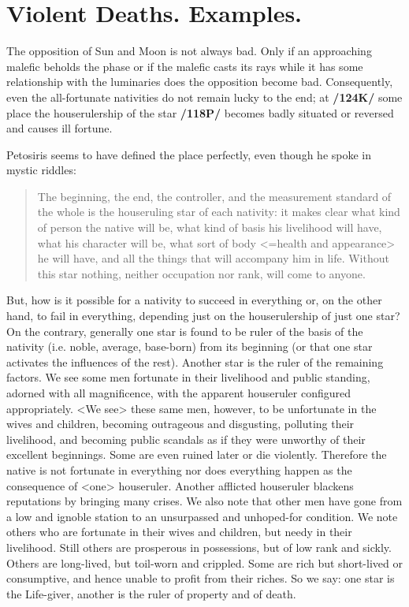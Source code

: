 \section{Violent Deaths. Examples.}

The opposition of Sun and Moon is not always bad. Only if an approaching malefic beholds the phase or if the malefic casts its rays while it has some relationship with the luminaries does the opposition become bad. Consequently, even the all-fortunate nativities do not remain lucky to the end; at \textbf{/124K/} some place the houserulership of the star \textbf{/118P/} becomes badly situated or reversed and causes ill fortune.

Petosiris seems to have defined the place perfectly, even though he spoke in mystic riddles: \begin{quote}The
beginning, the end, the controller, and the measurement standard of the whole is the houseruling star of
each nativity: it makes clear what kind of person the native will be, what kind of basis his livelihood will have, what his character will be, what sort of body <=health and appearance> he will have, and all the things that will accompany him in life. Without this star nothing, neither occupation nor rank, will come to anyone.\end{quote}

But, how is it possible for a nativity to succeed in everything or, on the other hand, to fail in everything, depending just on the houserulership of just one star? On the contrary, generally one star is found to be ruler of the basis of the nativity (i.e. noble, average, base-born) from its beginning (or that one star activates the influences of the rest). Another star is the ruler of the remaining factors. We see some men fortunate in their livelihood and public standing, adorned with all magnificence, with the apparent houseruler configured appropriately. <We see> these same men, however, to be unfortunate in the wives
and children, becoming outrageous and disgusting, polluting their livelihood, and becoming public scandals as if they were unworthy of their excellent beginnings. Some are even ruined later or die violently. Therefore the native is not fortunate in everything nor does everything happen as the consequence of <one> houseruler. Another afflicted houseruler blackens reputations by bringing many crises. We also note that other men have gone from a low and ignoble station to an unsurpassed and unhoped-for condition. We note others who are fortunate in their wives and children, but needy in their livelihood. Still others are prosperous in possessions, but of low rank and sickly. Others are long-lived, but toil-worn and crippled. Some are rich but short-lived or consumptive, and hence unable to profit from their riches. So we say: one star is the Life-giver, another is the ruler of property and of death.

